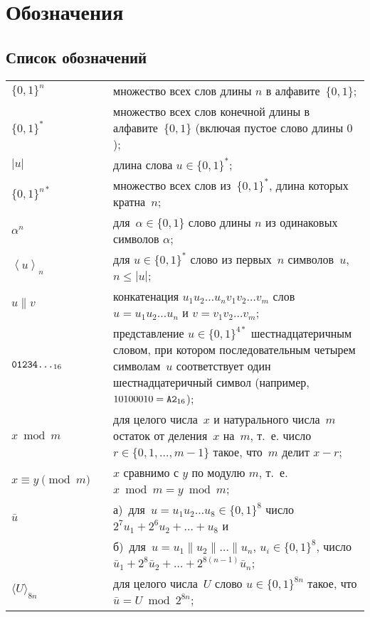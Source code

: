 \chapter{Обозначения}\label{DEFS}

\section{Список обозначений}

{\tabcolsep 0pt
\begin{longtable}{lrp{13.5cm}}
$\{0,1\}^n$  & \hspace{2mm} &
множество всех слов длины $n$ в алфавите~$\{0,1\}$;
\\[4pt]
$\{0,1\}^*$  &&
множество всех слов конечной длины в алфавите~$\{0,1\}$
(включая пустое слово длины $0$);
\\[4pt]
$|u|$      &&
длина слова $u\in\{0,1\}^*$;
\\[4pt]
%
$\{0,1\}^{n*}$  &&
множество всех слов из~$\{0,1\}^*$,
длина которых кратна~$n$;
\\[4pt]
%
$\alpha^n$  &&
для~$\alpha\in\{0,1\}$ слово длины $n$ из одинаковых символов $\alpha$;
\\[4pt]
%
%
$\left\langle u\right\rangle_n$  &&
для $u\in\{0,1\}^*$
слово из первых~$n$ символов~$u$, $n\leq|u|$;
\\[4pt]
%
$u\parallel v$  &&
конкатенация
$u_1 u_2\ldots u_n v_1 v_2\ldots v_m$
слов
$u=u_1 u_2\ldots u_n$ и
$v=v_1 v_2\ldots v_m$;
\\[4pt]
%
$\texttt{01234\ldots}_{16}$ && 
представление $u\in\{0,1\}^{4*}$ шестнадцатеричным словом,
при котором последовательным четырем символам~$u$ соответствует
один шестнадцатеричный символ
(например, $10100010=\texttt{A2}_{16}$);
\\[4pt]
%
$x\bmod m$             &&
для целого числа~$x$ и натурального числа~$m$ 
остаток от деления~$x$ на~$m$,
т.~е. число $r\in\{0,1,\ldots,m-1\}$ такое, что~$m$ делит $x-r$;
\\[4pt]
%
$x\equiv y\pmod m$    &&
$x$ сравнимо с $y$ по модулю $m$, т.~е. $x\bmod m=y\bmod m$;
\\[4pt]
%
$\bar u$                &&
а)~для~$u=u_1 u_2\ldots u_8\in\{0,1\}^8$
число $2^7 u_1+2^6 u_2+\ldots+u_8$ и\\[2pt]
%
                        &&
б)~для~$u=u_1\parallel u_2\parallel\ldots\parallel u_n$, $u_i\in\{0,1\}^8$,
число~$\bar u_1+2^8\bar u_2+\ldots+2^{8(n-1)}\bar u_n$;
\\[4pt]
%
$\langle U\rangle_{8n}$ &&
для целого числа~$U$ 
слово $u\in\{0,1\}^{8n}$ такое, что $\bar u=U\bmod 2^{8n}$;

\end{longtable}}

